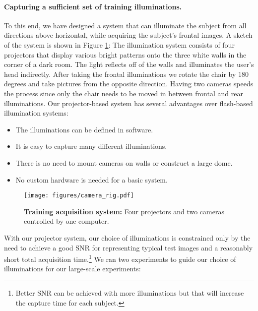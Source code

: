 \documentclass[10pt,twocolumn,letterpaper]{article}
\begin{document}
\paragraph{Capturing a sufficient set of training illuminations.}   To this end, we have designed a system that can illuminate the subject from all directions above horizontal, while acquiring the subject's frontal images. A sketch of the system is shown in Figure \ref{fig:system}: The illumination system consists of four projectors that display various bright patterns onto the three white walls in the corner of a dark room.  The light reflects off of the walls and illuminates the user's head indirectly.  After taking the frontal illuminations we rotate the chair by 180 degrees and take pictures from the opposite direction.  Having two cameras speeds the process since only the chair needs to be moved in between frontal and rear illuminations.  
Our projector-based system has several advantages over flash-based illumination systems:\vspace{-2mm}
\begin{itemize}
\item The illuminations can be defined in software.\vspace{-2mm}
\item It is easy to capture many different illuminations.\vspace{-2mm}
\item There is no need to mount cameras on walls or construct a large dome.\vspace{-2mm}
\item No custom hardware is needed for a basic system.\vspace{-2mm}
\end{itemize}
\begin{figure}
\centerline{\hspace{-0.1in}\texttt{[image: figures/camera\_rig.pdf]}}
\caption{{\bf Training acquisition system:} Four projectors and two cameras controlled by one computer.\vspace{-8mm}}
\label{fig:system}
\end{figure}
With our projector system, our choice of illuminations is constrained only by the need to achieve a good SNR for representing typical test images and a reasonably short total acquisition time.\footnote{Better SNR can be achieved with more illuminations but that will increase the capture time for each subject.}  We ran two experiments to guide our choice of illuminations for our large-scale experiments:\vspace{-2mm}  
\end{document}
